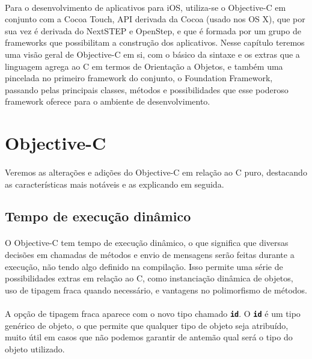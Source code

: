 \documentclass[a4paper,12pt,brazil,doubleside]{book}
\begin{document}
\begin{singlespace}
\paragraph{}Para o desenvolvimento de aplicativos para iOS, utiliza-se o Objective-C em conjunto com a Cocoa Touch, API derivada da Cocoa (usado nos OS X), que por sua vez é derivada do NextSTEP e OpenStep, e que é formada por um grupo de frameworks que possibilitam a construção dos aplicativos. Nesse capítulo teremos uma visão geral de Objective-C em si, com o básico da sintaxe e os extras que a linguagem agrega ao C em termos de Orientação a Objetos, e também uma pincelada no primeiro framework do conjunto, o Foundation Framework, passando pelas principais classes, métodos e possibilidades que esse poderoso framework oferece para o ambiente de desenvolvimento.

\bigskip 
\bigskip


\section{Objective-C}

\paragraph{}Veremos as alterações e adições do Objective-C em relação ao C puro, destacando as características mais notáveis e as explicando em seguida.

\bigskip

\subsection{Tempo de execução dinâmico}

\paragraph{}O Objective-C tem tempo de execução dinâmico, o que significa que diversas decisões em chamadas de métodos e envio de mensagens serão feitas durante a execução, não tendo algo definido na compilação. Isso permite uma série de possibilidades extras em relação ao C, como instanciação dinâmica de objetos, uso de tipagem fraca quando necessário, e vantagens no polimorfismo de métodos.
\paragraph{}A opção de tipagem fraca aparece com o novo tipo chamado \texttt{\textbf{id}}. O \texttt{\textbf{id}} é um tipo genérico de objeto, o que permite que qualquer tipo de objeto seja atribuído, muito útil em casos que não podemos garantir de antemão qual será o tipo do objeto utilizado.


\end{singlespace}
\end{document}
